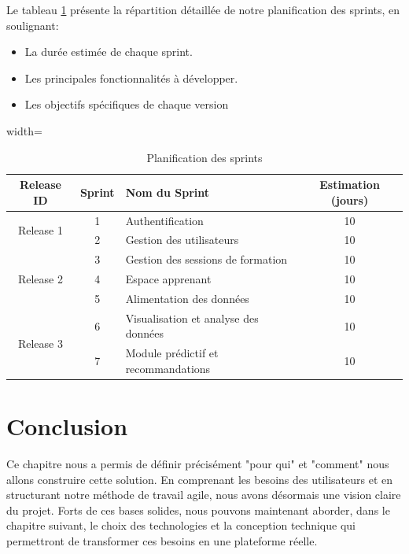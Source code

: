\noindent Le tableau \ref{tab:release_planning} présente la répartition détaillée de notre planification des sprints, en soulignant:
\begin{itemize}

  \item  La durée estimée de chaque sprint.
  \item Les principales fonctionnalités à développer.
  \item Les objectifs spécifiques de chaque version
 \end{itemize}
\begin{table}[H]
\centering
\caption{Planification des sprints}
\label{tab:release_planning}
\begin{adjustbox}{width=\textwidth}
\begin{tabular}{|c|c|l|c|}
\hline
\textbf{Release ID} & \textbf{Sprint} & \textbf{Nom du Sprint} & \textbf{Estimation (jours)} \\
\hline

\multirow{2}{*}{Release 1} 
& 1 & Authentification & 10 \\
\cline{2-4}
& 2 & Gestion des utilisateurs & 10 \\
\hline

\multirow{3}{*}{Release 2} 
& 3 & Gestion des sessions de formation & 10 \\
\cline{2-4}
& 4 & Espace apprenant & 10 \\
\cline{2-4}
& 5 & Alimentation des données & 10 \\
\hline

\multirow{2}{*}{Release 3} 
& 6 & Visualisation et analyse des données & 10 \\
\cline{2-4}
& 7 & Module prédictif et recommandations & 10 \\
\hline

\end{tabular}
\end{adjustbox}
\end{table}

\section{Conclusion} 

Ce chapitre nous a permis de définir précisément "pour qui" et "comment" nous allons construire cette solution. En comprenant les besoins des utilisateurs et en structurant notre méthode de travail agile, nous avons désormais une vision claire du projet. Forts de ces bases solides, nous pouvons maintenant aborder, dans le chapitre suivant, le choix des technologies et la conception technique qui permettront de transformer ces besoins en une plateforme réelle.